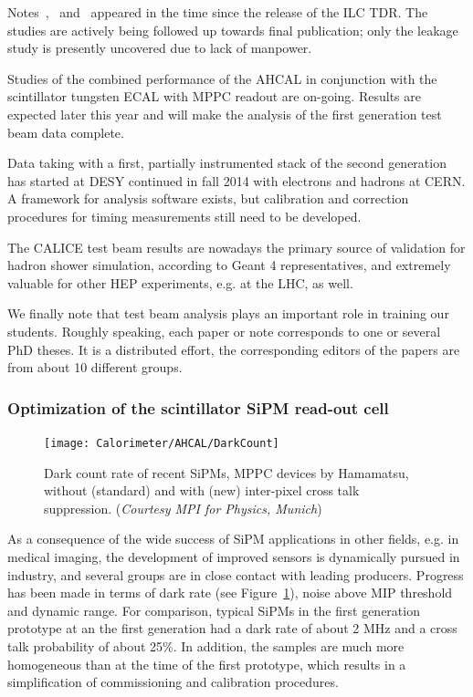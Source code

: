 Notes~\cite{Calice:CAN048},~\cite{Calice:CAN049} and~\cite{Calice:CAN051} appeared in the time since the release of the ILC TDR. The studies are actively being followed up towards final publication; only the leakage study is presently uncovered due to lack of manpower.

Studies of the combined performance of the AHCAL in conjunction with the scintillator tungsten ECAL with MPPC readout are on-going. Results are expected later this year and will make the analysis of the first generation test beam data complete.

Data taking with a first, partially instrumented stack of the second generation has started at DESY continued in fall 2014 with electrons and hadrons at CERN. A framework for analysis software exists, but calibration and correction procedures for timing measurements still need to be developed.

The CALICE test beam results are nowadays the primary source of validation for hadron shower simulation, according to Geant 4 representatives, and extremely valuable for other HEP experiments, e.g. at the LHC, as well.

We finally note that test beam analysis plays an important role in training our students. Roughly speaking, each paper or note corresponds to one or several PhD theses. It is a distributed effort, the corresponding editors of the papers are from about 10 different groups.

\subsubsection{Optimization of the scintillator SiPM read-out cell}
\label{sec:OptimizationSiPMRO}

\begin{figure}
	\centering
	\texttt{[image: Calorimeter/AHCAL/DarkCount]}
	\caption{Dark count rate of recent SiPMs, MPPC devices by Hamamatsu, without (standard) and with (new) inter-pixel cross talk suppression. ({\it Courtesy MPI for Physics, Munich})}
	\label{fig:Calorimeter:AHCAL:DarkCount}
\end{figure}

As a consequence of the wide success of SiPM applications in other fields, e.g. in medical imaging, the development of improved sensors is dynamically pursued in industry, and several groups are in close contact with leading producers. Progress has been made in terms of dark rate (see Figure~\ref{fig:Calorimeter:AHCAL:DarkCount}), noise above MIP threshold and dynamic range. For comparison, typical SiPMs in the first generation prototype at an the first generation had a dark rate of about 2 MHz and a cross talk probability of about 25\%. In addition, the samples are much more homogeneous than at the time of the first prototype, which results in a simplification of commissioning and calibration procedures.

